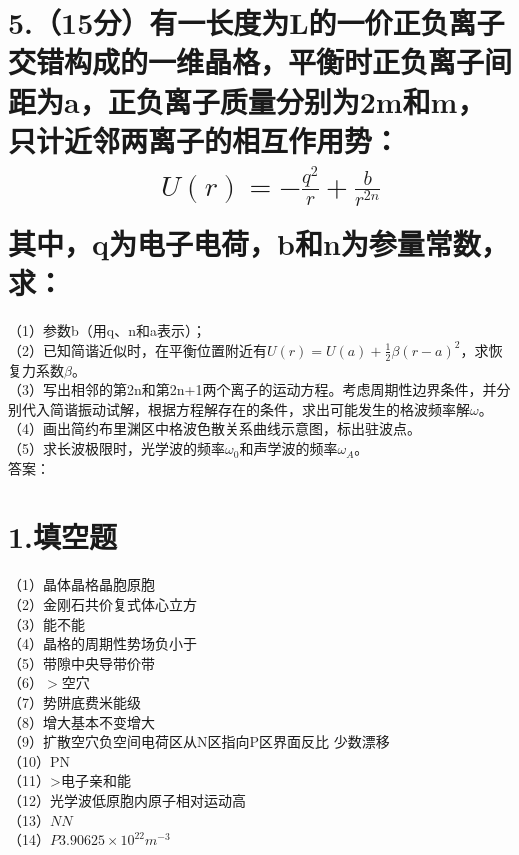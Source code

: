 \documentclass[UTF8]{ctexart}
\begin{document}
\section*{5.（15分）有一长度为L的一价正负离子交错构成的一维晶格，平衡时正负离子间距为a，正负离子质量分别为2m和m，只计近邻两离子的相互作用势：
\begin{equation*}
    \begin{aligned}
        & U(r)=-\frac{q^2}{r}+\frac{b}{r^{2n}}\\
    \end{aligned}
\end{equation*}
其中，q为电子电荷，b和n为参量常数，求：}
（1）参数b（用q、n和a表示）；\\
（2）已知简谐近似时，在平衡位置附近有$U(r)=U(a)+\frac{1}{2}\beta(r-a)^2$，求恢复力系数$\beta$。\\
（3）写出相邻的第2n和第2n+1两个离子的运动方程。考虑周期性边界条件，并分别代入简谐振动试解，根据方程解存在的条件，求出可能发生的格波频率解$\omega$。\\
（4）画出简约布里渊区中格波色散关系曲线示意图，标出驻波点。\\
（5）求长波极限时，光学波的频率$\omega_0$和声学波的频率$\omega_A$。\\


答案：\\
\section*{1.填空题}
（1）晶体晶格晶胞原胞\\
（2）金刚石共价复式体心立方\\
（3）能不能\\
（4）晶格的周期性势场负小于\\
（5）带隙中央导带价带\\
（6）$>$空穴\\
（7）势阱底费米能级\\
（8）增大基本不变增大\\
（9）扩散空穴负空间电荷区从N区指向P区界面反比
少数漂移\\
（10）PN\\
（11）>电子亲和能\\
（12）光学波低原胞内原子相对运动高\\
（13）$N$$N$\\
（14）$P$$3.90625\times10^{22}m^{-3}$\\
\end{document}
